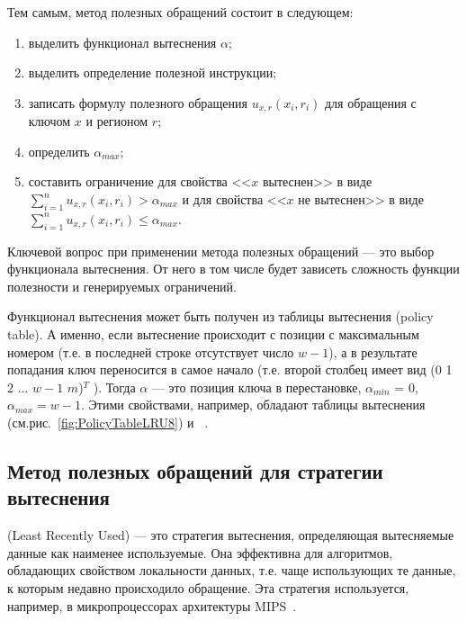 \begin{enumerate}
Тем самым, метод полезных обращений состоит в следующем:
\begin{enumerate}
  \item выделить функционал вытеснения $\alpha$;
  \item выделить определение полезной инструкции;
  \item записать формулу полезного обращения $u_{x,r}(x_i, r_i)$ для обращения с ключом $x$ и регионом $r$;
  \item определить $\alpha_{max}$;
  \item составить ограничение для свойства <<$x$ вытеснен>> в виде
$\sum\limits_{i=1}^n u_{x,r}(x_i, r_i) > \alpha_{max}$ и для свойства <<$x$ не
вытеснен>> в виде $\sum\limits_{i=1}^n u_{x,r}(x_i,r_i) \leqslant \alpha_{max}$.
\end{enumerate}

Ключевой вопрос при применении метода полезных обращений --- это выбор
функционала вытеснения. От него в том числе будет зависеть сложность функции
полезности и генерируемых ограничений.

 Функционал вытеснения может быть получен из таблицы вытеснения
(policy table). А именно, если вытеснение происходит с позиции с максимальным
номером (т.е. в последней строке отсутствует число $w{-}1$), а в результате
попадания ключ переносится в самое начало (т.е. второй столбец имеет вид (0 1 2
... $w{-}1$ $m$)$^T$ ). Тогда $\alpha$ --- это позиция ключа в перестановке,
$\alpha_{min}$ = 0, $\alpha_{max} = w{-}1$. Этими свойствами, например, обладают
таблицы вытеснения \LRU (см.рис.~\ref{fig:PolicyTableLRU8}) и
\PseudoLRU~\cite{policy_tables}.



\subsection{Метод полезных обращений для стратегии вытеснения \LRU}

\LRU (Least Recently Used) --- это стратегия вытеснения,
определяющая вытесняемые данные как наименее используемые. Она
эффективна для алгоритмов, обладающих свойством локальности данных,
т.е. чаще использующих те данные, к которым недавно происходило
обращение. Эта стратегия используется, например, в микропроцессорах
архитектуры MIPS~\cite{mips64II}.


\end{enumerate}
